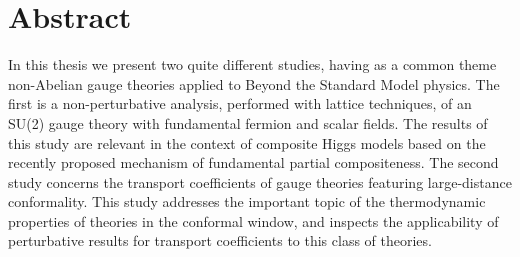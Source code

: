 \chapter*{Abstract}

In this thesis we present two quite different studies, having as a common theme non-Abelian gauge theories applied to Beyond the Standard Model physics. The first is a non-perturbative analysis, performed with lattice techniques, of an SU(2) gauge theory with fundamental fermion and scalar fields. The results of this study are relevant in the context of composite Higgs models based on the recently proposed mechanism of fundamental partial compositeness. The second study concerns the transport coefficients of gauge theories featuring large-distance conformality. This study addresses the important topic of the thermodynamic properties of theories in the conformal window, and inspects the applicability of perturbative results for transport coefficients to this class of theories.

